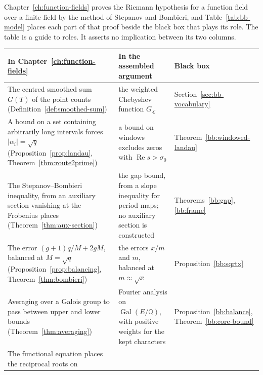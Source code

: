 \documentclass[11pt]{amsbook}
\theoremstyle{plain}
\theoremstyle{definition}
\theoremstyle{remark}
\numberwithin{equation}{section}
\numberwithin{figure}{chapter}
\numberwithin{table}{chapter}
\newcommand{\Q}{\mathbb{Q}}
\newcommand{\lev}{\mathscr{L}}
\newcommand{\Gal}{\operatorname{Gal}}
\begin{document}
\begin{table}[htbp]
\centering

\caption{Chebyshev's factorial comparison and the corresponding
parts of the present argument. The slope comparison and the
inert-prime gain are developed in
Chapters~\ref{ch:theta}--\ref{ch:covolume}.}
\label{tab:analogy}
\end{table}

Chapter~\ref{ch:function-fields} proves the Riemann hypothesis for
a function field over a finite field by the method of Stepanov and
Bombieri, and Table~\ref{tab:bb-model} places each part of that
proof beside the black box that plays its role. The table is a
guide to roles. It asserts no implication between its two columns.

\begin{table}[htbp]
\centering\small
\renewcommand{\arraystretch}{1.25}
\begin{tabular}{@{}>{\raggedright\arraybackslash}p{4.3cm}
  >{\raggedright\arraybackslash}p{4.5cm}
  >{\raggedright\arraybackslash}p{2.9cm}@{}}
\toprule
In Chapter~\ref{ch:function-fields} & In the assembled argument &
Black box\\
\midrule
The centred smoothed sum $G(T)$ of the point counts
(Definition~\ref{def:smoothed-sum}) &
the weighted Chebyshev function $G_\lev$ &
Section~\ref{sec:bb-vocabulary}\\
A bound on a set containing arbitrarily long intervals forces
$|\alpha_i|=\sqrt q$ (Proposition~\ref{prop:landau},
Theorem~\ref{thm:route2prime}) &
a bound on windows excludes zeros with
$\operatorname{Re}s>\sigma_0$ &
Theorem~\ref{bb:windowed-landau}\\
The Stepanov--Bombieri inequality, from an auxiliary section
vanishing at the Frobenius places
(Theorem~\ref{thm:aux-section}) &
the gap bound, from a slope inequality for period maps; no
auxiliary section is constructed &
Theorems~\ref{bb:gap}, \ref{bb:frame}\\
The error $(g+1)q/M+2gM$, balanced at $M=\sqrt q$
(Proposition~\ref{prop:balancing}, Theorem~\ref{thm:bombieri}) &
the errors $x/m$ and $m$, balanced at $m\approx\sqrt x$ &
Proposition~\ref{bb:sqrtx}\\
Averaging over a Galois group to pass between upper and lower bounds
(Theorem~\ref{thm:averaging}) &
Fourier analysis on $\Gal(E/\Q)$, with positive weights for the kept
characters &
Proposition~\ref{bb:balance}, Theorem~\ref{bb:core-bound}\\
The functional equation places the reciprocal roots on

\end{tabular}
\end{table}
\end{document}
